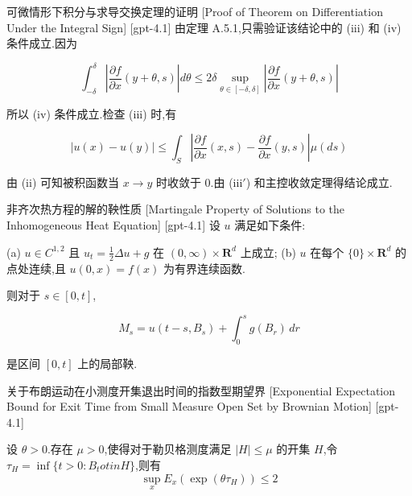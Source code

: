 \documentclass[UTF8]{ctexart}
\begin{document}
    
    
    \begin{prf}
        {可微情形下积分与求导交换定理的证明}
        [Proof of Theorem on Differentiation Under the Integral Sign]
        [gpt-4.1]
        由定理 A.5.1,只需验证该结论中的 (iii) 和 (iv) 条件成立.因为

\[
\int_{-\delta}^{\delta} \left| \frac{\partial f}{\partial x}(y + \theta, s) \right| d \theta \leq 2\delta \sup_{\theta \in [ -\delta, \delta ]} \left| \frac{\partial f}{\partial x}(y + \theta, s) \right|
\]

所以 (iv) 条件成立.检查 (iii) 时,有

\[
| 
u(x) - 
u(y) | \leq \int_{S} \left| \frac{\partial f}{\partial x}(x, s) - \frac{\partial f}{\partial x}(y, s) \right| \mu(d s)
\]

由 (ii) 可知被积函数当 $x \to y$ 时收敛于 0.由 (iii$'$) 和主控收敛定理得结论成立.

    \end{prf}
    
    
    
    \begin{thm}
        {非齐次热方程的解的鞅性质}
        [Martingale Property of Solutions to the Inhomogeneous Heat Equation]
        [gpt-4.1]
        设 $u$ 满足如下条件:

(a) $u \in C^{1,2}$ 且 $u_{t} = \frac{1}{2} \Delta u + g$ 在 $(0, \infty) \times \mathbf{R}^{d}$ 上成立;
(b) $u$ 在每个 $\{0\} \times \mathbf{R}^{d}$ 的点处连续,且 $u(0, x) = f(x)$ 为有界连续函数.

则对于 $s \in [0, t]$,

\[
M_{s} = u(t-s, B_{s}) + \int_{0}^{s} g(B_{r})\, dr
\]

是区间 $[0, t]$ 上的局部鞅.

    \end{thm}
    
    
    
    \begin{lma}
        {关于布朗运动在小测度开集退出时间的指数型期望界}
        [Exponential Expectation Bound for Exit Time from Small Measure Open Set by Brownian Motion]
        [gpt-4.1]
        
设 $\theta > 0$.存在 $\mu > 0$,使得对于勒贝格测度满足 $|H| \leq \mu$ 的开集 $H$,令 $\tau_{H} = \operatorname{inf}\{ t > 0 : B_{t} 
otin H \}$,则有
\[
\sup_{x} E_{x}\left( \exp(\theta \tau_{H}) \right) \leq 2
\]

    \end{lma}
    
\end{document}
